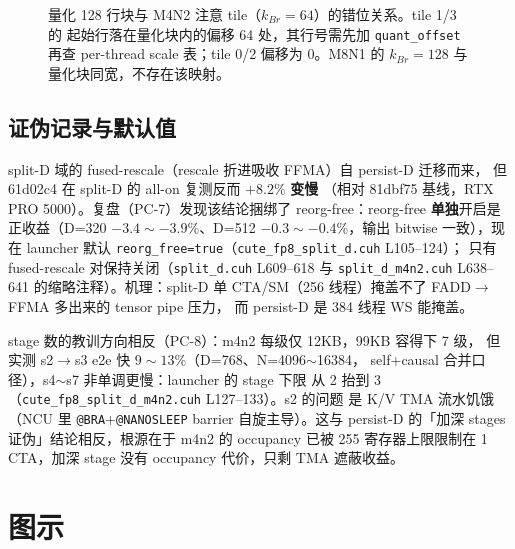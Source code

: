 \begin{figure}[H]
\caption{量化 128 行块与 M4N2 注意 tile（$k_{Br}{=}64$）的错位关系。tile 1/3 的
起始行落在量化块内的偏移 64 处，其行号需先加 \texttt{quant\_offset} 再查 per-thread
scale 表；tile 0/2 偏移为 0。M8N1 的 $k_{Br}{=}128$ 与量化块同宽，不存在该映射。}
\label{fig:30-quant-align}
\end{figure}

\subsection{证伪记录与默认值}

split-D 域的 fused-rescale（rescale 折进吸收 FFMA）自 persist-D 迁移而来，
但 61d02c4 在 split-D 的 all-on 复测反而 $+8.2\%$ \textbf{变慢}
（相对 81dbf75 基线，RTX PRO 5000）。复盘（PC-7）发现该结论捆绑了
reorg-free：reorg-free
\textbf{单独}开启是正收益（D=320 $-3.4\sim-3.9\%$、D=512
$-0.3\sim-0.4\%$，输出 bitwise 一致），现在 launcher 默认
\texttt{reorg\_free=true}（\texttt{cute\_fp8\_split\_d.cuh} L105--124）；
只有 fused-rescale 对保持关闭（\texttt{split\_d.cuh} L609--618 与
\texttt{split\_d\_m4n2.cuh} L638--641 的缩略注释）。机理：split-D
单 CTA/SM（256 线程）掩盖不了 FADD$\to$FFMA 多出来的 tensor pipe 压力，
而 persist-D 是 384 线程 WS 能掩盖。

stage 数的教训方向相反（PC-8）：m4n2 每级仅 12KB，99KB 容得下 7 级，
但实测 s2$\to$s3 e2e 快 $9\sim13\%$（D=768、N=4096$\sim$16384，
self+causal 合并口径），s4$\sim$s7 非单调更慢：launcher 的 stage 下限
从 2 抬到 3（\texttt{cute\_fp8\_split\_d\_m4n2.cuh} L127--133）。s2 的问题
是 K/V TMA 流水饥饿（NCU 里 \texttt{@BRA}+\texttt{@NANOSLEEP} barrier
自旋主导）。这与 persist-D 的「加深 stages 证伪」结论相反，根源在于
m4n2 的 occupancy 已被 255 寄存器上限限制在 1 CTA，加深 stage 没有 occupancy
代价，只剩 TMA 遮蔽收益。

\section{图示}

